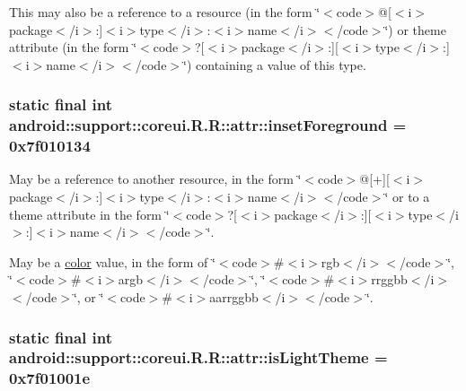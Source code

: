 This may also be a reference to a resource (in the form \char`\"{}$<$code$>$@\mbox{[}$<$i$>$package$<$/i$>$:\mbox{]}$<$i$>$type$<$/i$>$:$<$i$>$name$<$/i$>$$<$/code$>$\char`\"{}) or theme attribute (in the form \char`\"{}$<$code$>$?\mbox{[}$<$i$>$package$<$/i$>$:\mbox{]}\mbox{[}$<$i$>$type$<$/i$>$:\mbox{]}$<$i$>$name$<$/i$>$$<$/code$>$\char`\"{}) containing a value of this type. \hypertarget{classandroid_1_1support_1_1coreui_1_1_r_1_1attr_5c7f98bb571fba1112fb140d5128a912}{
\subsubsection[{insetForeground}]{\setlength{\rightskip}{0pt plus 5cm}static final int android::support::coreui.R.R::attr::insetForeground = 0x7f010134}}
\label{classandroid_1_1support_1_1coreui_1_1_r_1_1attr_5c7f98bb571fba1112fb140d5128a912}


May be a reference to another resource, in the form \char`\"{}$<$code$>$@\mbox{[}+\mbox{]}\mbox{[}$<$i$>$package$<$/i$>$:\mbox{]}$<$i$>$type$<$/i$>$:$<$i$>$name$<$/i$>$$<$/code$>$\char`\"{} or to a theme attribute in the form \char`\"{}$<$code$>$?\mbox{[}$<$i$>$package$<$/i$>$:\mbox{]}\mbox{[}$<$i$>$type$<$/i$>$:\mbox{]}$<$i$>$name$<$/i$>$$<$/code$>$\char`\"{}. 

May be a \hyperlink{classandroid_1_1support_1_1coreui_1_1_r_1_1color}{color} value, in the form of \char`\"{}$<$code$>$\#$<$i$>$rgb$<$/i$>$$<$/code$>$\char`\"{}, \char`\"{}$<$code$>$\#$<$i$>$argb$<$/i$>$$<$/code$>$\char`\"{}, \char`\"{}$<$code$>$\#$<$i$>$rrggbb$<$/i$>$$<$/code$>$\char`\"{}, or \char`\"{}$<$code$>$\#$<$i$>$aarrggbb$<$/i$>$$<$/code$>$\char`\"{}. \hypertarget{classandroid_1_1support_1_1coreui_1_1_r_1_1attr_276098cdeb36c7edf4b9d4d26f6ecc28}{
\subsubsection[{isLightTheme}]{\setlength{\rightskip}{0pt plus 5cm}static final int android::support::coreui.R.R::attr::isLightTheme = 0x7f01001e}}
\label{classandroid_1_1support_1_1coreui_1_1_r_1_1attr_276098cdeb36c7edf4b9d4d26f6ecc28}


